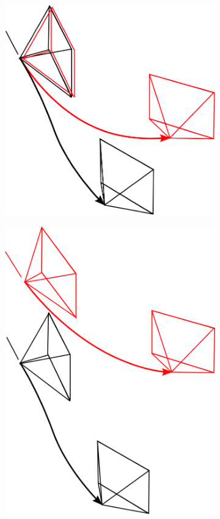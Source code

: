 \begin{figure}
  \hspace*{1cm}
  \begin{subfigure}[b]{0.3\textwidth}
    \includegraphics[width=\textwidth]{images/ape_frames_2.png}
    \caption{}
    \label{fig:3}
  \end{subfigure}
  \hfill
  \begin{subfigure}[b]{0.28\textwidth}
    \includegraphics[width=\textwidth]{images/rpe_frames_2.png}

\end{subfigure}
\end{figure}
